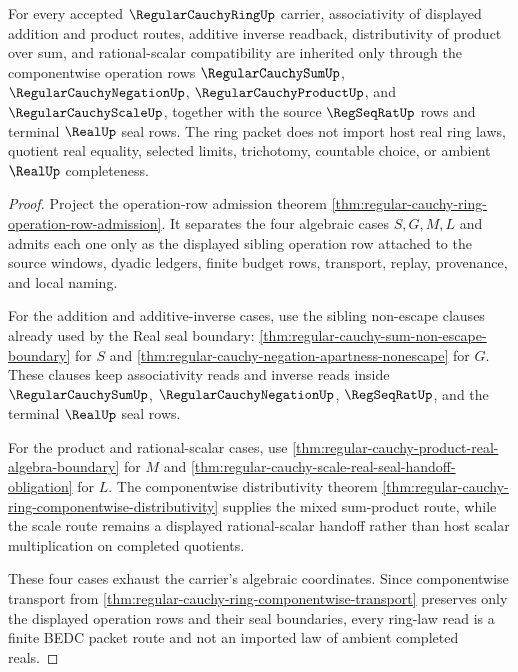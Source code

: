 \begin{theorem}
\label{thm:regularcauchyring-componentwise-ring-laws}
For every accepted $\RegularCauchyRingUp$ carrier, associativity of displayed addition and product routes, additive inverse readback, distributivity of product over sum, and rational-scalar compatibility are inherited only through the componentwise operation rows $\RegularCauchySumUp$, $\RegularCauchyNegationUp$, $\RegularCauchyProductUp$, and $\RegularCauchyScaleUp$, together with the source $\RegSeqRatUp$ rows and terminal $\RealUp$ seal rows. The ring packet does not import host real ring laws, quotient real equality, selected limits, trichotomy, countable choice, or ambient $\RealUp$ completeness.
\end{theorem}
\begin{proof}
Project the operation-row admission theorem \autoref{thm:regular-cauchy-ring-operation-row-admission}. It separates the four algebraic cases $S,G,M,L$ and admits each one only as the displayed sibling operation row attached to the source windows, dyadic ledgers, finite budget rows, transport, replay, provenance, and local naming.

For the addition and additive-inverse cases, use the sibling non-escape clauses already used by the Real seal boundary: \autoref{thm:regular-cauchy-sum-non-escape-boundary} for $S$ and \autoref{thm:regular-cauchy-negation-apartness-nonescape} for $G$. These clauses keep associativity reads and inverse reads inside $\RegularCauchySumUp$, $\RegularCauchyNegationUp$, $\RegSeqRatUp$, and the terminal $\RealUp$ seal rows.

For the product and rational-scalar cases, use \autoref{thm:regular-cauchy-product-real-algebra-boundary} for $M$ and \autoref{thm:regular-cauchy-scale-real-seal-handoff-obligation} for $L$. The componentwise distributivity theorem \autoref{thm:regular-cauchy-ring-componentwise-distributivity} supplies the mixed sum-product route, while the scale route remains a displayed rational-scalar handoff rather than host scalar multiplication on completed quotients.

These four cases exhaust the carrier's algebraic coordinates. Since componentwise transport from \autoref{thm:regular-cauchy-ring-componentwise-transport} preserves only the displayed operation rows and their seal boundaries, every ring-law read is a finite BEDC packet route and not an imported law of ambient completed reals.
\end{proof}

